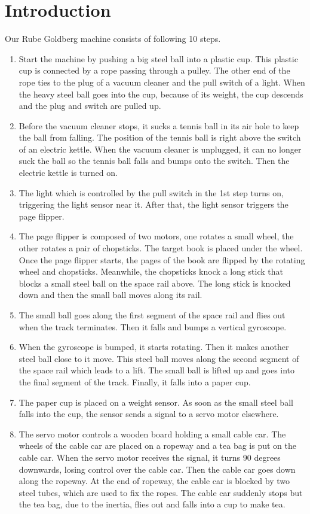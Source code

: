 \documentclass[twoside,a4paper]{refart}
\begin{document}
\section{Introduction}
		Our Rube Goldberg machine consists of following 10 steps.
		\begin{enumerate}
			\item Start the machine by pushing a big steel ball into a plastic cup. This plastic cup is connected by a rope passing through a pulley. The other end of the rope ties to the plug of a vacuum cleaner and the pull switch of a light. When the heavy steel ball goes into the cup, because of its weight, the cup descends and the plug and switch are pulled up.
			\item Before the vacuum cleaner stops, it sucks a tennis ball in its air hole to keep the ball from falling. The position of the tennis ball is right above the switch of an electric kettle. When the vacuum cleaner is unplugged, it can no longer suck the ball so the tennis ball falls and bumps onto the switch. Then the electric kettle is turned on.
			\item The light which is controlled by the pull switch in the 1st step turns on, triggering the light sensor near it. After that, the light sensor triggers the page flipper.
			\item The page flipper is composed of two motors, one rotates a small wheel, the other rotates a pair of chopsticks. The target book is placed under the wheel. Once the page flipper starts, the pages of the book are flipped by the rotating wheel and chopsticks. Meanwhile, the chopsticks knock a long stick that blocks a small steel ball on the space rail above. The long stick is knocked down and then the small ball moves along its rail.
			\item The small ball goes along the first segment of the space rail and flies out when the track terminates. Then it falls and bumps a vertical gyroscope.
			\item When the gyroscope is bumped, it starts rotating. Then it makes another steel ball close to it move. This steel ball moves along the second segment of the space rail which leads to a lift. The small ball is lifted up and goes into the final segment of the track. Finally, it falls into a paper cup.
			\item The paper cup is placed on a weight sensor. As soon as the small steel ball falls into the cup, the sensor sends a signal to a servo motor elsewhere.
			\item The servo motor controls a wooden board holding a small cable car. The wheels of the cable car are placed on a ropeway and a tea bag is put on the cable car. When the servo motor receives the signal, it turns 90 degrees downwards, losing control over the cable car. Then the cable car goes down along the ropeway. At the end of ropeway, the cable car is blocked by two steel tubes, which are used to fix the ropes. The cable car suddenly stops but the tea bag, due to the inertia, flies out and falls into a cup to make tea.

\end{enumerate}
\end{document}
